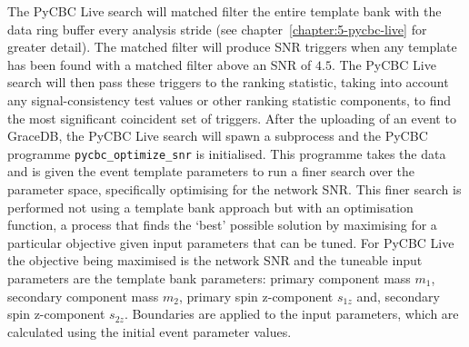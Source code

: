 The PyCBC Live search will matched filter the entire template bank with the data ring buffer every analysis stride (see chapter~\ref{chapter:5-pycbc-live} for greater detail). The matched filter will produce SNR triggers when any template has been found with a matched filter above an SNR of $4.5$. The PyCBC Live search will then pass these triggers to the ranking statistic, taking into account any signal-consistency test values or other ranking statistic components, to find the most significant coincident set of triggers. After the uploading of an event to GraceDB, the PyCBC Live search will spawn a subprocess and the PyCBC programme \texttt{pycbc\_optimize\_snr} is initialised. This programme takes the \gwadj data and is given the event template parameters to run a finer search over the parameter space, specifically optimising for the network SNR. This finer search is performed not using a template bank approach but with an optimisation function, a process that finds the `best' possible solution by maximising for a particular objective given input parameters that can be tuned. For PyCBC Live the objective being maximised is the network SNR and the tuneable input parameters are the template bank parameters: primary component mass $m_{1}$, secondary component mass $m_{2}$, primary spin z-component $s_{1z}$ and, secondary spin z-component $s_{2z}$. Boundaries are applied to the input parameters, which are calculated using the initial event parameter values.

